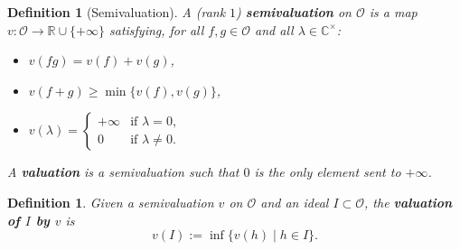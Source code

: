 \documentclass[reqno,dvipsnames,12pt]{amsart}
\newtheorem{defi}[thm]{Definition}
\begin{document}
\begin{defi}[Semivaluation]
A (rank $1$) \textbf{semivaluation} on $\mathcal{O}$ is a map
$
v:\mathcal{O} \longrightarrow \mathbb{R} \cup \{ +\infty \}
$
satisfying, for all $f,g \in \mathcal{O}$ and all $\lambda \in \mathbb{C}^{\times}$:

\begin{itemize}
\item $v(fg) = v(f) + v(g)$,
\item $v(f+g) \geq \min\{v(f),v(g)\}$,
\item $v(\lambda) = \begin{cases}
+\infty & \text{if } \lambda=0,\\
0 & \text{if } \lambda \neq 0.
\end{cases}$
\end{itemize}

A \textbf{valuation} is a semivaluation such that $0$ is the only element sent to $+\infty$.
\end{defi}

\begin{defi}
Given a semivaluation $v$ on $\mathcal{O}$ and an ideal $I \subset \mathcal{O}$, the \textbf{valuation of $I$ by $v$} is
\[
v(I) := \inf \{ v(h) \mid h \in I \}.
\]
\end{defi}
\end{document}
